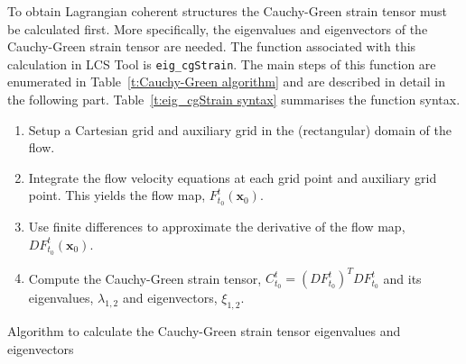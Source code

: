 \documentclass{article}
\begin{document}
To obtain Lagrangian coherent structures the Cauchy-Green strain tensor must be calculated first. More specifically, the eigenvalues and eigenvectors of the Cauchy-Green strain tensor are needed. The function associated with this calculation in LCS Tool is \lstinline!eig_cgStrain!. The main steps of this function are enumerated in Table~\ref{t:Cauchy-Green algorithm} and are described in detail in the following part. Table~\ref{t:eig_cgStrain syntax} summarises the function syntax.

\begin{table}
\begin{enumerate}
\item Setup a Cartesian grid and auxiliary grid in the (rectangular) domain of the flow.
\item Integrate the flow velocity equations at each grid point and auxiliary grid point. This yields the flow map, $F_{t_0}^t(\boldsymbol x_0)$.
\item Use finite differences to approximate the derivative of the flow map, $D F_{t_0}^t(\boldsymbol x_0)$.
\item Compute the Cauchy-Green strain tensor, $C_{t_0}^t = \left(D F_{t_0}^t\right)^T D F_{t_0}^t$ and its eigenvalues, $\lambda_{1,2}$ and eigenvectors, $\xi_{1,2}$.
\end{enumerate}
\caption{Algorithm to calculate the Cauchy-Green strain tensor eigenvalues and eigenvectors}
\label{t:Cauchy-Green algorithm}
\end{table}
\end{document}
